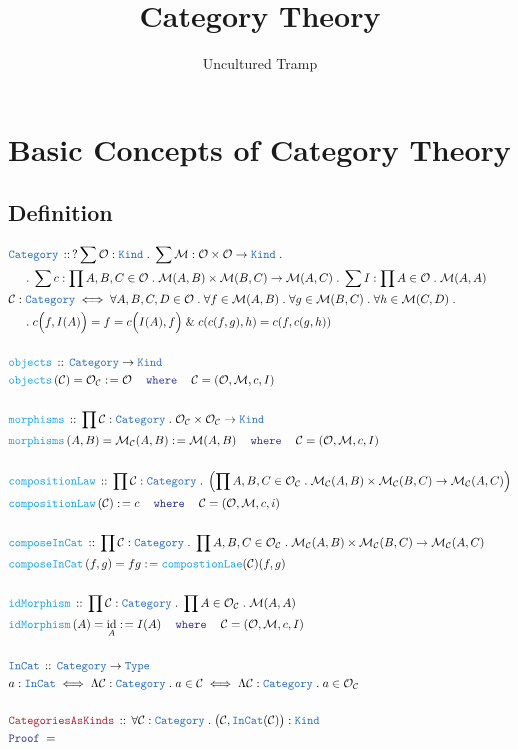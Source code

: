 \documentclass[12pt]{scrartcl}
\author{Uncultured Tramp}
\title{Category Theory}
\newcommand{\TYPE}[1]{\textcolor{NavyBlue}{\mathtt{#1}}}
\newcommand{\FUNC}[1]{\textcolor{Cerulean}{\mathtt{#1}}}
\newcommand{\LOGIC}[1]{\textcolor{Blue}{\mathtt{#1}}}
\newcommand{\THM}[1]{\textcolor{Maroon}{\mathtt{#1}}}
\renewcommand{\.}{\; . \;}
\newcommand{\de}{: \kern 0.1pc =}
\newcommand{\where}{\LOGIC{where}}
\newcommand{\Act}[1]{\left( #1 \right)}
\newcommand{\Theorem}[2]{& \THM{#1} \, :: \, #2 \\ & \Proof = \\ }
\newcommand{\DeclareType}[2]{& \TYPE{#1} \, :: \, #2 \\}
\newcommand{\DefineType}[3]{& #1 : \TYPE{#2} \iff #3 \\}
\newcommand{\DefineNamedType}[4]{& #1 : \TYPE{#2} \iff #3 \iff #4 \\}
\newcommand{\DeclareFunc}[2]{& \FUNC{#1} \, :: \, #2 \\}
\newcommand{\DefineFunc}[3]{&  \FUNC{#1}\Act{#2} \de #3 \\}
\newcommand{\DefineNamedFunc}[4]{&  \FUNC{#1}\Act{#2} = #3 \de #4 \\}
\newcommand{\NewLine}{\\ & \kern 1pc}
\newcommand{\Page}[1]{ \begin{align*} #1 \end{align*}   }
\renewcommand{\And}{\; \& \;}
\newcommand{\Type}{\TYPE{Type}}
\newcommand{\Class}{\TYPE{Kind}}
\DeclareMathOperator*{\id}{id}
\newcommand{\Cat}{\TYPE{Category}}
\newcommand{\Mor}{\mathcal{M}}
\newcommand{\Obj}{\mathcal{O}}
\newcommand{\Proof}{\LOGIC{Proof} \; }
\newcommand{\C}{\mathcal{C}}
\begin{document}
\maketitle
\newpage
\tableofcontents
\newpage
\section{Basic Concepts of Category Theory }
\subsection{Definition}
\Page{
	\DeclareType{Category}{? \sum \mathcal{O} : \Class \. \sum \mathcal{M} : 
			\mathcal{O} \times \mathcal{O} \to \Class \. 
			\NewLine \. 
			\sum  c : \prod A,B,C \in \mathcal{O} \. 
			\mathcal{M}(A,B) \times \mathcal{M}(B,C) \to \mathcal{M}(A,C) \.
			\sum I : \prod A \in \mathcal{O} \. \mathcal{M}(A,A)   
		}
	\DefineType{\C}{Category}{ \forall A,B,C,D \in \mathcal{O} \. \forall f \in \mathcal{M}(A,B) \. 
		\forall g \in \mathcal{M}(B,C) \. \forall h \in \mathcal{M}(C,D) \. \NewLine \. 
		c\Big(f, I(A)\Big) = f = c\Big(I(A),f\Big)  \And c(c(f,g),h) = c(f,c(g,h))    }
	\\
	\DeclareFunc{objects}{\Cat \to \Class}
	\DefineNamedFunc{objects}{\C}{\Obj_{\C}}{\Obj \kern 1pc \where \kern 1pc \C = ( \Obj,\Mor, c, I  ) }	
	\\
	\DeclareFunc{morphisms}{\prod \C : \Cat \. \Obj_\C \times \Obj_\C \to \Class }
	\DefineNamedFunc{morphisms}{A,B}{\Mor_{\C}(A,B)}{ \Mor(A,B)  \kern 1pc \where \kern 1pc \C = (\Obj,\Mor, c, I)   }
	\\
	\DeclareFunc{compositionLaw}{\prod \C : \Cat \. \left( \prod A,B,C \in \Obj_\C \. \Mor_\C(A,B) \times \Mor_\C(B,C) \to
		\Mor_\C(A,C) \right)  
	}
	\DefineFunc{compositionLaw}{\C}{c \kern 1pc \where \kern 1pc \C = (\Obj, \Mor, c, i)}
	\\
	\DeclareFunc{composeInCat}{\prod \C : \Cat \. \prod A,B,C \in \Obj_\C \. 
		\Mor_\C(A,B) \times \Mor_\C(B,C) \to \Mor_\C(A,C) }
	\DefineNamedFunc{composeInCat}{f,g}{fg}{\FUNC{compostionLae}(\C)(f,g)}
	\\
	\DeclareFunc{idMorphism}{\prod \C : \Cat \. \prod A \in \Obj_\C \. \Mor(A,A)}
	\DefineNamedFunc{idMorphism}{A}{\id_A}{I(A) \kern 1pc \where \kern 1pc \C = (\Obj,\Mor,c,I)}
	\\
	\DeclareType{InCat}{ \Cat \to \Type  }
	\DefineNamedType{a}{InCat}{\Lambda \C : \Cat \. a \in \C }{ \Lambda \C : \Cat \. a \in \Obj_\C  }
	\\
	\Theorem{CategoriesAsKinds}{\forall \C : \Cat \. \big(\C,\TYPE{InCat}(\C)\big) : \Class }
}
\end{document}
